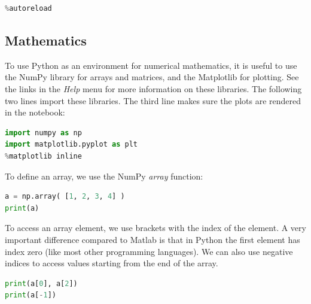 \documentclass[a4paper , 12pt]{book}
\begin{document}
\begin{center}
\begin{lstlisting}[language=Python, frame=single]
%load_ext autoreload
%autoreload
\end{lstlisting}   
\end{center}

\subsection{Mathematics}

To use Python as an environment for numerical mathematics, it is useful to use the NumPy library for arrays and matrices, and the Matplotlib for plotting. See the links in the \textit{Help} menu for more information on these libraries. The following two lines import these libraries. The third line makes sure the plots are rendered in the notebook:

\begin{center}
\begin{lstlisting}[language=Python, frame=single]
import numpy as np
import matplotlib.pyplot as plt
%matplotlib inline
\end{lstlisting}
\end{center}

To define an array, we use the NumPy \textit{array} function:

\begin{center}
\begin{lstlisting}[language=Python, frame=single]
a = np.array( [1, 2, 3, 4] )
print(a)
\end{lstlisting}
\end{center}

To access an array element, we use brackets with the index of the element. A very important difference compared to Matlab is that in Python the first element has index zero (like most other programming languages). We can also use negative indices to access values starting from the end of the array.

\begin{center}
\begin{lstlisting}[language=Python, frame=single]
print(a[0], a[2])
print(a[-1])
\end{lstlisting}
\end{center}
\end{document}

